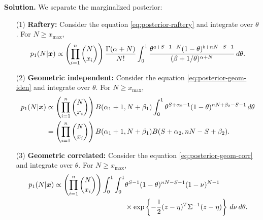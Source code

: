 \vspace{2ex}

    {\bf Solution.} We separate the marginalized posterior:
    \begin{enumerate}
        \item[(1)] {\bf Raftery:} Consider the equation
        \ref{eq:posterior-raftery} and integrate over $\theta$. For $N \ge
        x_{\max}$, 
        \begin{equation}
            p_1(N|\boldsymbol{x}) \propto \left(\prod_{i=1}^n \binom{N}{x_i}\right)\frac{\Gamma(\alpha+N)}{N!} \int_0^1 \frac{\theta^{a+S-1-N}(1-\theta)^{b+nN-S-1}}{(\beta + 1/\theta)^{\alpha + N}} \, d\theta.
        \end{equation} 
        \item[(2)] {\bf Geometric independent:} Consider the equation
        \ref{eq:posterior-geom-iden} and integrate over $\theta$. For $N \ge
        x_{\max}$,
        \begin{equation}
            \label{eq:p1-geom-indep}
            \begin{split}
                p_1(N|\boldsymbol{x}) &\propto \left(\prod_{i=1}^n \binom{N}{x_i}\right) B(\alpha_1+1,N+\beta_1)\int_0^1 \theta^{S + \alpha_2-1}(1-\theta)^{nN + \beta_2-S-1} \, d\theta \\
                &= \left(\prod_{i=1}^n \binom{N}{x_i}\right) B(\alpha_1+1,N+\beta_1)B(S+\alpha_2, nN - S + \beta_2).
            \end{split}
        \end{equation}
        \item[(3)] {\bf Geometric correlated:}  Consider the equation
        \ref{eq:posterior-geom-corr} and integrate over $\theta$. For $N \ge
        x_{\max}$, 
        \begin{equation}
            \label{eq:p1-geom-corr}
            \begin{split}
                p_1(N|\boldsymbol{x}) \propto \left(\prod_{i=1}^n \binom{N}{x_i}\right) \int_0^1 \int_0^1 &\theta^{S-1}(1 - \theta)^{nN - S-1}(1-\nu)^{N-1} \\
                &\times\exp\left\{-\frac{1}{2}(z - \eta)^T\Sigma^{-1}(z-\eta)\right\} \, d\nu \, d\theta .       
            \end{split}
        \end{equation} 
    \end{enumerate} 